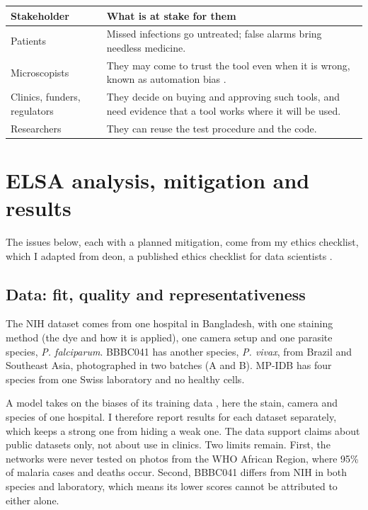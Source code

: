 \documentclass[11pt,a4paper]{article}
\begin{document}
{\small
\begin{longtable}{@{}>{\raggedright\arraybackslash}p{110.3pt}>{\raggedright\arraybackslash}p{305.7pt}@{}}
\toprule
Stakeholder & What is at stake for them \\
\midrule
\endhead
\bottomrule
\endfoot
\bottomrule
\endlastfoot
Patients & Missed infections go untreated; false alarms bring needless medicine. \\
Microscopists & They may come to trust the tool even when it is wrong, known as automation bias \citep{goddard2012}. \\
Clinics, funders, regulators & They decide on buying and approving such tools, and need evidence that a tool works where it will be used. \\
Researchers & They can reuse the test procedure and the code. \\
\end{longtable}}
\addtocounter{table}{-1}

\section{ELSA analysis, mitigation and results}

The issues below, each with a planned mitigation, come from my ethics checklist, which I adapted from deon, a published ethics checklist for data scientists \citep{deon}.

\subsection{Data: fit, quality and representativeness}

The NIH dataset comes from one hospital in Bangladesh, with one staining method (the dye and how it is applied), one camera setup and one parasite species, \emph{P. falciparum}. BBBC041 has another species, \emph{P. vivax}, from Brazil and Southeast Asia, photographed in two batches (A and B). MP-IDB has four species from one Swiss laboratory and no healthy cells.

A model takes on the biases of its training data \citep{johnson2021}, here the stain, camera and species of one hospital. I therefore report results for each dataset separately, which keeps a strong one from hiding a weak one. The data support claims about public datasets only, not about use in clinics. Two limits remain. First, the networks were never tested on photos from the WHO African Region, where 95\% of malaria cases and deaths occur. Second, BBBC041 differs from NIH in both species and laboratory, which means its lower scores cannot be attributed to either alone.
\end{document}
